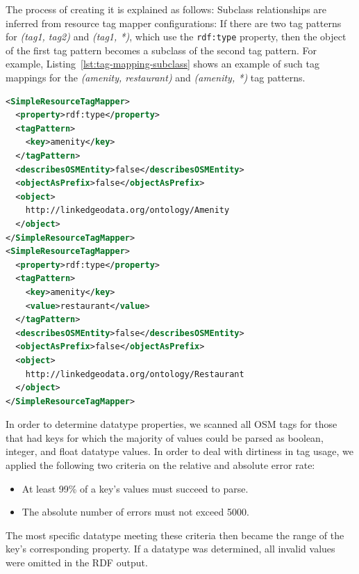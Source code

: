 The process of creating it is explained as follows:
Subclass relationships are inferred from resource tag mapper configurations: If
there are two tag patterns for \emph{(tag1, tag2)} and \emph{(tag1, *)}, which
use the \verb|rdf:type| property, then the object of the first tag pattern
becomes a subclass of the second tag pattern. For example,
Listing~\ref{lst:tag-mapping-subclass} shows an example of such tag mappings
for the \emph{(amenity, restaurant)} and \emph{(amenity, *)} tag patterns.


\begin{scriptsize}
\begin{lstlisting}[label=lst:tag-mapping-subclass, language=XML, caption=Subclass relationship example.]
<SimpleResourceTagMapper>
  <property>rdf:type</property>
  <tagPattern>
    <key>amenity</key>
  </tagPattern>
  <describesOSMEntity>false</describesOSMEntity>
  <objectAsPrefix>false</objectAsPrefix>
  <object>
    http://linkedgeodata.org/ontology/Amenity
  </object>
</SimpleResourceTagMapper>
<SimpleResourceTagMapper>
  <property>rdf:type</property>
  <tagPattern>
    <key>amenity</key>
    <value>restaurant</value>
  </tagPattern>
  <describesOSMEntity>false</describesOSMEntity>
  <objectAsPrefix>false</objectAsPrefix>
  <object>
    http://linkedgeodata.org/ontology/Restaurant
  </object>
</SimpleResourceTagMapper>
\end{lstlisting}
\end{scriptsize}

In order to determine datatype properties, we scanned all OSM tags for those that had keys for which the majority of values could be parsed as boolean, integer, and float datatype values. 
In order to deal with dirtiness in tag usage, we applied the following two criteria on the relative and absolute error rate:
\begin{itemize}
  \item At least 99\% of a key's values must succeed to parse.
  \item The absolute number of errors must not exceed 5000.
\end{itemize}
The most specific datatype meeting these criteria then became the range of the key's corresponding property. 
If a datatype was determined, all invalid values were omitted in the RDF output.


